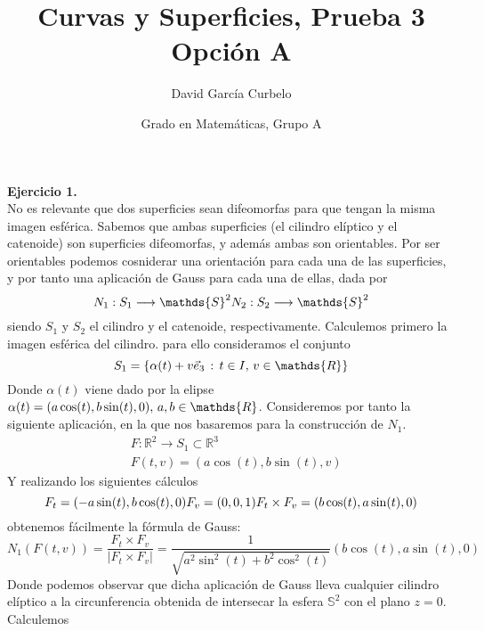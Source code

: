 \documentclass[fleqn]{article}
\author{David García Curbelo}
\title{Curvas y Superficies, Prueba 3 Opción A}
\date{Grado en Matemáticas, Grupo A}
\def\R{\mathds{R}}
\begin{document}
    \maketitle
    \setcounter{page}{1}
    \pagestyle{plain}

    \textbf{Ejercicio 1. } \\

    No es relevante que dos superficies sean difeomorfas para que tengan la misma imagen esférica. Sabemos que ambas superficies (el cilindro elíptico y el catenoide) 
    son superficies difeomorfas, y además ambas son orientables. Por ser orientables podemos cosniderar una orientación para cada una de las superficies, y por tanto una aplicación 
    de Gauss para cada una de ellas, dada por 
    \begin{equation*}
        N_1: S_1 \longrightarrow \mathds{S}^2\\
        N_2: S_2 \longrightarrow \mathds{S}^2
    \end{equation*}
    siendo $S_1$ y $S_2$ el cilindro y el catenoide, respectivamente. Calculemos primero la imagen esférica del cilindro. para ello consideramos el conjunto
    $$S_1 = \{\alpha(t) + v\vec{e}_3 \thinspace : \thinspace t\in I, \thinspace v\in \R\}$$
    Donde $\alpha(t)$ viene dado por la elipse $\alpha(t) = (a\cos(t), b\sin(t), 0), \thinspace a,b\in \R$. Consideremos por tanto la siguiente aplicación, en la que nos basaremos para 
    la construcción de $N_1$.
    \begin{equation*}
        \begin{aligned}
            & F:\R^2 \rightarrow S_1 \subset \R^3 \\
            &F(t,v) = (a\cos(t), b\sin(t), v)
        \end{aligned}
    \end{equation*}
    Y realizando los siguientes cálculos
    \begin{equation*}
        F_t = (-a\sin(t), b\cos(t), 0) \\
        F_v = (0,0,1) \\
        F_t \times F_v = (b\cos(t), a\sin(t), 0)
    \end{equation*}
    obtenemos fácilmente la fórmula de Gauss:
    $$N_1(F(t,v)) = \frac{F_t \times F_v}{\left|F_t \times F_v\right|} = \frac{1}{\sqrt{a^2\sin^2(t) + b^2\cos^2(t)}} (b\cos(t), a\sin(t), 0)$$
    Donde podemos observar que dicha aplicación de Gauss lleva cualquier cilindro elíptico a la circunferencia obtenida de intersecar la esfera $\mathds{S}^2$ con el plano $z=0$. Calculemos
\end{document}
